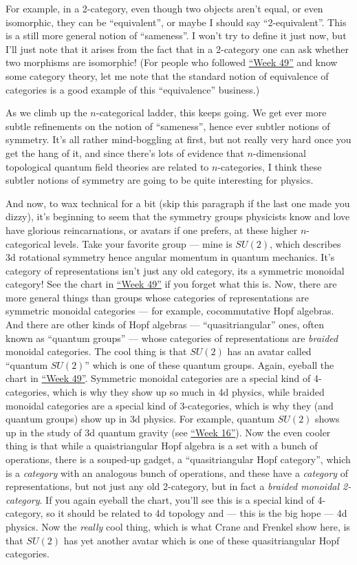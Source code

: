 \documentclass{article}
\begin{document}
For example, in a 2-category, even though two objects aren't equal, or
even isomorphic, they can be ``equivalent'', or maybe I should say
``2-equivalent''. This is a still more general notion of ``sameness''. I
won't try to define it just now, but I'll just note that it arises from
the fact that in a 2-category one can ask whether two morphisms are
isomorphic! (For people who followed \protect\hyperlink{week49}{``Week
49''} and know some category theory, let me note that the standard
notion of equivalence of categories is a good example of this
``equivalence'' business.)

As we climb up the \(n\)-categorical ladder, this keeps going. We get
ever more subtle refinements on the notion of ``sameness'', hence ever
subtler notions of symmetry. It's all rather mind-boggling at first, but
not really very hard once you get the hang of it, and since there's lots
of evidence that \(n\)-dimensional topological quantum field theories
are related to \(n\)-categories, I think these subtler notions of
symmetry are going to be quite interesting for physics.

And now, to wax technical for a bit (skip this paragraph if the last one
made you dizzy), it's beginning to seem that the symmetry groups
physicists know and love have glorious reincarnations, or avatars if one
prefers, at these higher \(n\)-categorical levels. Take your favorite
group --- mine is \(SU(2)\), which describes 3d rotational symmetry
hence angular momentum in quantum mechanics. It's category of
representations isn't just any old category, its a symmetric monoidal
category! See the chart in \protect\hyperlink{week49}{``Week 49''} if
you forget what this is. Now, there are more general things than groups
whose categories of representations are symmetric monoidal categories
--- for example, cocommutative Hopf algebras. And there are other kinds
of Hopf algebras --- ``quasitriangular'' ones, often known as ``quantum
groups'' --- whose categories of representations are \emph{braided}
monoidal categories. The cool thing is that \(SU(2)\) has an avatar
called ``quantum \(SU(2)\)'' which is one of these quantum groups.
Again, eyeball the chart in \protect\hyperlink{week49}{``Week 49''}.
Symmetric monoidal categories are a special kind of 4-categories, which
is why they show up so much in 4d physics, while braided monoidal
categories are a special kind of 3-categories, which is why they (and
quantum groups) show up in 3d physics. For example, quantum \(SU(2)\)
shows up in the study of 3d quantum gravity (see
\protect\hyperlink{week16}{``Week 16''}). Now the even cooler thing is
that while a quaistriangular Hopf algebra is a set with a bunch of
operations, there is a souped-up gadget, a ``quasitriangular Hopf
category'', which is a \emph{category} with an analogous bunch of
operations, and these have a \emph{category} of representations, but not
just any old 2-category, but in fact a \emph{braided monoidal
2-category}. If you again eyeball the chart, you'll see this is a
special kind of 4-category, so it should be related to 4d topology and
--- this is the big hope --- 4d physics. Now the \emph{really} cool
thing, which is what Crane and Frenkel show here, is that \(SU(2)\) has
yet another avatar which is one of these quasitriangular Hopf
categories.
\end{document}
